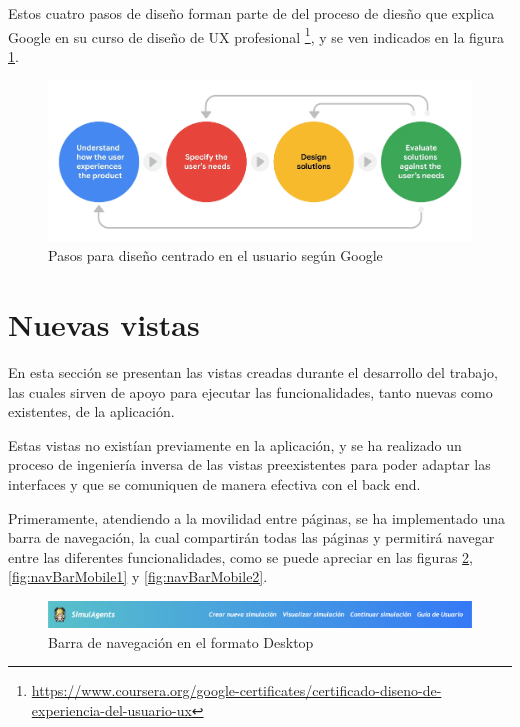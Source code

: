 Estos cuatro pasos de diseño forman parte de del proceso de diesño que explica Google en su curso de diseño de UX profesional \footnote{\url{https://www.coursera.org/google-certificates/certificado-diseno-de-experiencia-del-usuario-ux}}, y se ven indicados en la figura \ref{fig:pasosDisenoUsuario}.

\begin{figure}[h]
	\centering
	\includegraphics[width = 1\textwidth]{Imagenes/Vectorial/pasos_DCU.png}
	\caption{Pasos para diseño centrado en el usuario según Google}
	\label{fig:pasosDisenoUsuario}
\end{figure}

\section{Nuevas vistas}

En esta sección se presentan las vistas creadas durante el desarrollo del trabajo, las cuales sirven de apoyo para ejecutar las funcionalidades, tanto nuevas como existentes, de la aplicación.

Estas vistas no existían previamente en la aplicación, y se ha realizado un proceso de ingeniería inversa de las vistas preexistentes para poder adaptar las interfaces y que se comuniquen de manera efectiva con el back end.

Primeramente, atendiendo a la movilidad entre páginas, se ha implementado una barra de navegación, la cual compartirán todas las páginas y permitirá navegar entre las diferentes funcionalidades, como se puede apreciar en las figuras \ref{fig:navBarDesktop}, \ref{fig:navBarMobile1} y \ref{fig:navBarMobile2}.

\begin{figure}[h]
	\centering
	\includegraphics[width = 1\textwidth]{Imagenes/Vectorial/navBarDesktop.png}
	\caption{Barra de navegación en el formato Desktop}
	\label{fig:navBarDesktop}
\end{figure}

